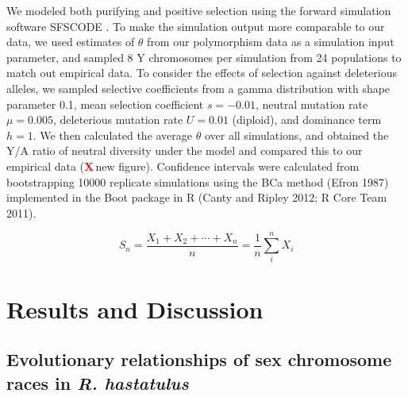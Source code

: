 \documentclass[9pt,twocolumn,twoside]{gsajnl}
\newcommand{\X}{\textcolor{red}{\bf X\,}}
\begin{document}
We modeled both purifying and positive selection using the forward simulation software SFSCODE \citep{hernandez2008flexible}. To make the simulation output more comparable to our data, we used estimates of $\theta$ from our polymorphism data as a simulation input parameter, and sampled 8 Y chromosomes per simulation from 24 populations to match out empirical data. To consider the effects of selection against deleterious alleles, we sampled selective coefficients from a gamma distribution with shape parameter 0.1, mean selection coefficient $s=-0.01$, neutral mutation rate $\mu = 0.005$, deleterious mutation rate $U=0.01$ (diploid), and dominance term $h=1$. We then calculated the average $\theta$ over all simulations, and obtained the Y/A ratio of neutral diversity under the model and compared this to our empirical data (\X new figure). Confidence intervals were calculated from bootstrapping 10000 replicate simulations  using the BCa method (Efron 1987) implemented in the Boot package in R (Canty and Ripley 2012; R Core Team 2011). 

\begin{equation}
S_n = \frac{X_1 + X_2 + \cdots + X_n}{n}
      = \frac{1}{n}\sum_{i}^{n} X_i
\label{eq:refname1}
\end{equation}


\section*{Results and Discussion}

\subsection*{Evolutionary relationships of sex chromosome races in \textit{R. hastatulus}}
\end{document}
